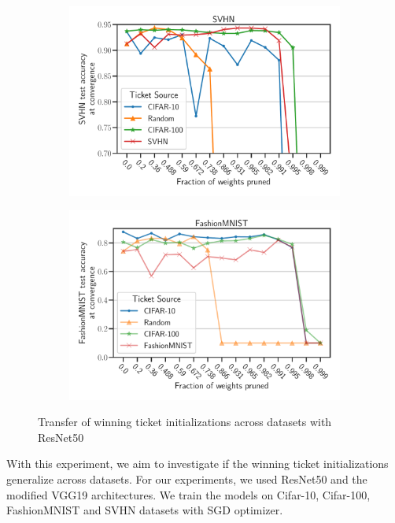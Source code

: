 \begin{figure}[h]
\begin{subfigure}[b]{0.45\textwidth}
                    \includegraphics[width=\linewidth]{../openreview/plots/Exp2_ResNet_SVHN_N.pdf}
            \end{subfigure}
            \begin{subfigure}[b]{0.45\textwidth}
                    \includegraphics[width=\linewidth]{../openreview/plots/Exp2_Resnet_FashionMNIST1_N.pdf}
            \end{subfigure}
        \caption{Transfer of winning ticket initializations across datasets with ResNet50}
        \label{fig:exp2_resnet}
    \end{figure}
    With this experiment, we aim to investigate if the winning ticket initializations generalize across datasets. For our experiments, we used ResNet50 and the modified VGG19 architectures. We train the models on Cifar-10, Cifar-100, FashionMNIST and SVHN datasets with SGD optimizer.\\ 
    
